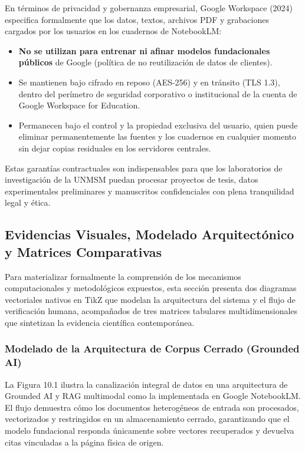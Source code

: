 En términos de privacidad y gobernanza empresarial, Google Workspace (2024) especifica formalmente que los datos, textos, archivos PDF y grabaciones cargados por los usuarios en los cuadernos de NotebookLM:
\begin{itemize}
    \item \textbf{No se utilizan para entrenar ni afinar modelos fundacionales públicos} de Google (política de no reutilización de datos de clientes).
    \item Se mantienen bajo cifrado en reposo (AES-256) y en tránsito (TLS 1.3), dentro del perímetro de seguridad corporativo o institucional de la cuenta de Google Workspace for Education.
    \item Permanecen bajo el control y la propiedad exclusiva del usuario, quien puede eliminar permanentemente las fuentes y los cuadernos en cualquier momento sin dejar copias residuales en los servidores centrales.
\end{itemize}

Estas garantías contractuales son indispensables para que los laboratorios de investigación de la UNMSM puedan procesar proyectos de tesis, datos experimentales preliminares y manuscritos confidenciales con plena tranquilidad legal y ética.

\newpage
\subsection{Evidencias Visuales, Modelado Arquitectónico y Matrices Comparativas}

Para materializar formalmente la comprensión de los mecanismos computacionales y metodológicos expuestos, esta sección presenta dos diagramas vectoriales nativos en TikZ que modelan la arquitectura del sistema y el flujo de verificación humana, acompañados de tres matrices tabulares multidimensionales que sintetizan la evidencia científica contemporánea.

\subsubsection{Modelado de la Arquitectura de Corpus Cerrado (Grounded AI)}

La Figura 10.1 ilustra la canalización integral de datos en una arquitectura de Grounded AI y RAG multimodal como la implementada en Google NotebookLM. El flujo demuestra cómo los documentos heterogéneos de entrada son procesados, vectorizados y restringidos en un almacenamiento cerrado, garantizando que el modelo fundacional responda únicamente sobre vectores recuperados y devuelva citas vinculadas a la página física de origen.

